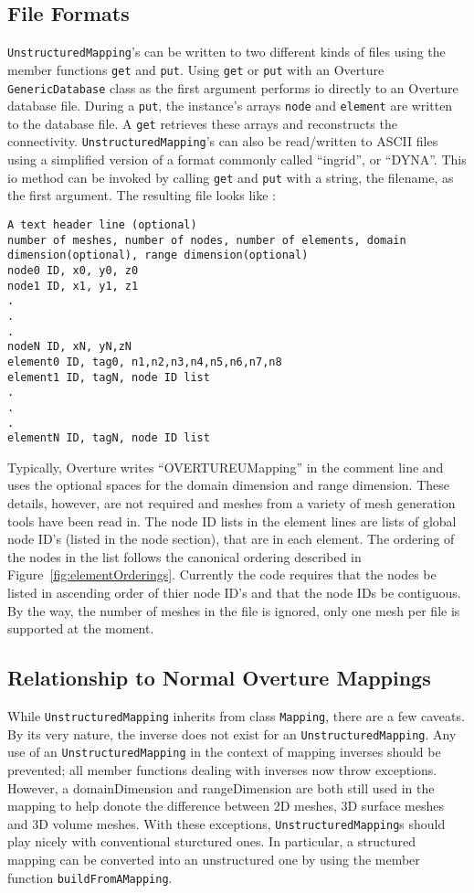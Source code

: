 \subsection{File Formats}
{\tt UnstructuredMapping}'s can be written to two different kinds of files using the
member functions {\tt get} and {\tt put}. Using {\tt get} or {\tt put} with an Overture
{\tt GenericDatabase} class as the first argument performs io directly to an 
Overture database file.  During a {\tt put}, the instance's arrays {\tt node} and {\tt element}
are written to the database file.  A {\tt get} retrieves these arrays and reconstructs the 
connectivity.  {\tt UnstructuredMapping}'s can also be read/written to ASCII files using a simplified 
version of a format commonly called ``ingrid'', or ``DYNA''.  This io method can be invoked 
by calling {\tt get} and {\tt put} with a string, the filename, as the first argument.  
The resulting file looks like :
{\footnotesize
\begin{verbatim}
A text header line (optional)
number of meshes, number of nodes, number of elements, domain dimension(optional), range dimension(optional)
node0 ID, x0, y0, z0
node1 ID, x1, y1, z1
.
.
.
nodeN ID, xN, yN,zN
element0 ID, tag0, n1,n2,n3,n4,n5,n6,n7,n8
element1 ID, tagN, node ID list
.
.
.
elementN ID, tagN, node ID list
\end{verbatim}
}
\noindent
Typically, Overture writes ``OVERTUREUMapping'' in the comment line and uses the optional
spaces for the domain dimension and range dimension.  These details, however, are not 
required and meshes from a variety of mesh generation tools have been read in.  The node ID
lists in the element lines are lists of global node ID's (listed in the node section),
that are in each element.  The ordering of the nodes in the list follows the canonical ordering
described in Figure~\ref{fig:elementOrderings}.  Currently the code requires that the nodes
be listed in ascending order of thier node ID's and that the node IDs be contiguous.  By the way,
the number of meshes in the file is ignored, only one mesh per file is supported at the moment.

\subsection{Relationship to Normal Overture Mappings}
While {\tt UnstructuredMapping} inherits from class {\tt Mapping}, 
there are a few caveats.  By its very nature, the inverse does not exist for 
an {\tt UnstructuredMapping}.  Any use of an {\tt UnstructuredMapping} in the context of 
mapping inverses should be prevented; all member functions dealing with inverses now throw exceptions.
However, a domainDimension and rangeDimension are both still used in the mapping to
help donote the difference between 2D meshes, 3D surface meshes and 3D volume meshes.
With these exceptions, {\tt UnstructuredMapping}s should play nicely with conventional
sturctured ones.  In particular, a structured mapping can be converted into an unstructured
one by using the member function {\tt buildFromAMapping}. 

% 
